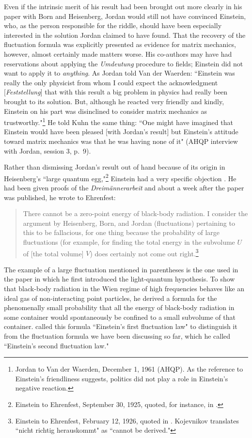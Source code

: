 \documentclass[12pt]{elsart}
\begin{document}
Even if the intrinsic merit of his result had been brought out more clearly in his paper with Born and Heisenberg, Jordan would still not have convinced Einstein, who, as the person responsible for the riddle, should have been especially interested in the solution Jordan claimed to have found. That the recovery of the fluctuation formula was explicitly presented as evidence for matrix mechanics, however, almost certainly made matters worse. His co-authors may have had reservations about applying the {\it Umdeutung} procedure to fields; Einstein did not want to apply it to {\it anything}. As Jordan told Van der Waerden: ``Einstein was really the only physicist from whom I could expect the acknowledgment [{\it Feststellung}] that with this result a big problem in physics had really been brought to its solution. But, although he reacted very friendly and kindly, Einstein on his part was disinclined to consider matrix mechanics as trustworthy."\footnote{Jordan to Van der Waerden, December 1, 1961 (AHQP). As the reference to Einstein's friendliness suggests, politics did not play a role in Einstein's negative reaction.} He told Kuhn the same thing: ``One might have imagined that Einstein would have been pleased [with Jordan's result] but Einstein's attitude toward matrix mechanics was that he was having none of it"
(AHQP interview with Jordan, session 3, p.\ 9).

Rather than dismissing Jordan's result out of hand because of its origin in Heisenberg's ``large quantum egg,"\footnote{Einstein to Ehrenfest, September 30, 1925, quoted, for instance, in \citep[p.\ 566]{Foelsing 1997}.} Einstein had a very specific objection \citep[p.\ 222]{Darrigol 1986}. 
He had been given proofs of the {\it Dreim\"annerarbeit} and about a week after the paper was published, he wrote to Ehrenfest: 
\begin{quotation}
There cannot be a zero-point energy of black-body radiation. I consider the argument by Heisenberg, Born, and Jordan (fluctuations) pertaining to this to be fallacious, for one thing because the probability of large fluctuations (for example, for finding the total energy in the subvolume $U$ of [the total volume] $V$) does certainly not come out right.\footnote{Einstein to Ehrenfest, February 12, 1926, quoted in \citep[p.\ 212]{Kojevnikov 1990}. Kojevnikov translates ``nicht richtig herauskommt" as ``cannot be derived."} 
\end{quotation}
The example of a large fluctuation mentioned in parentheses is the one \citet{Einstein 1905} used in the paper in which he first introduced the light-quantum hypothesis. To show that  black-body radiation in the Wien regime of high frequencies behaves like an ideal gas of non-interacting point particles, he derived a formula for the phenomenally small probability that all the energy of black-body radiation in some container would spontaneously be confined to a small subvolume of that container. \citet[pp.\ 161--162]{Jordan 1928} called this formula ``Einstein's first fluctuation law" to distinguish it from the fluctuation formula we have been discussing so far, which he called ``Einstein's second fluctuation law." 
\end{document}
